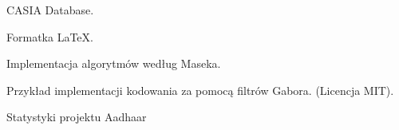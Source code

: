 \documentclass[10pt,polish,a4paper,oneside]{ppfcmthesis}
\begin{document}
{\begin{enumerate}[{[}A{]}]
	\item \label{web:CASIA} CASIA Database. \\

	\item \label{web:CASIA} Formatka LaTeX. \\

  \item \label{web:masekImplementation} Implementacja algorytmów według Maseka. \\

  \item \label{web:gaborImpl} Przykład implementacji kodowania za pomocą filtrów Gabora. (Licencja MIT). \\

  \item \label{web:aadhaar} Statystyki projektu Aadhaar

\end{enumerate}
}
 
\newpage
\thispagestyle{empty}
\listoffigures
\vfill\cleardoublepage

\newpage
\thispagestyle{empty}
\listoftables
\vfill\cleardoublepage

\ppcolophon
\end{document}
